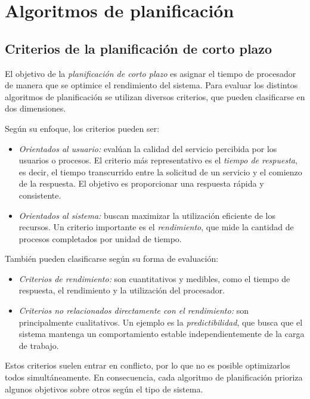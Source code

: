 \section{Algoritmos de planificación}

\subsection{Criterios de la planificación de corto plazo}

El objetivo de la \textit{planificación de corto plazo} es asignar el tiempo de procesador de manera que se optimice el rendimiento del sistema. Para evaluar los distintos algoritmos de planificación se utilizan diversos criterios, que pueden clasificarse en dos dimensiones.

Según su enfoque, los criterios pueden ser:
\begin{itemize}
  \item \textit{Orientados al usuario:} evalúan la calidad del servicio percibida por los usuarios o procesos. El criterio más representativo es el \textit{tiempo de respuesta}, es decir, el tiempo transcurrido entre la solicitud de un servicio y el comienzo de la respuesta. El objetivo es proporcionar una respuesta rápida y consistente.
  \item \textit{Orientados al sistema:} buscan maximizar la utilización eficiente de los recursos. Un criterio importante es el \textit{rendimiento}, que mide la cantidad de procesos completados por unidad de tiempo.
\end{itemize}

También pueden clasificarse según su forma de evaluación:
\begin{itemize}
  \item \textit{Criterios de rendimiento:} son cuantitativos y medibles, como el tiempo de respuesta, el rendimiento y la utilización del procesador.
  \item \textit{Criterios no relacionados directamente con el rendimiento:} son principalmente cualitativos. Un ejemplo es la \textit{predictibilidad}, que busca que el sistema mantenga un comportamiento estable independientemente de la carga de trabajo.
\end{itemize}

Estos criterios suelen entrar en conflicto, por lo que no es posible optimizarlos todos simultáneamente. En consecuencia, cada algoritmo de planificación prioriza algunos objetivos sobre otros según el tipo de sistema.

